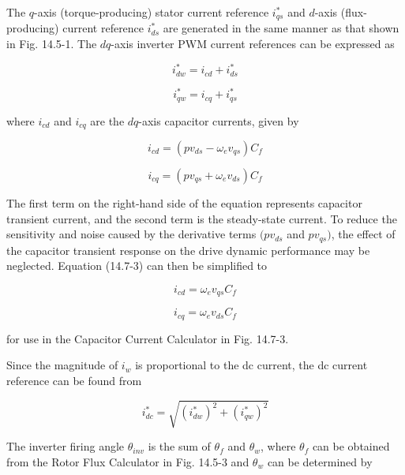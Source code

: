 \documentclass[letterpaper,12pt]{article}
\begin{document}
The $q$-axis (torque-producing) stator current reference $i_{qs}^*$ and $d$-axis (flux-producing) current reference $i_{ds}^*$ are generated in the same manner as that shown in Fig. 14.5-1. The $dq$-axis inverter PWM current references can be expressed as

\begin{equation}
i_{dw}^* = i_{cd} + i_{ds}^* \tag{14.7-2}
\end{equation}

\begin{equation}
i_{qw}^* = i_{cq} + i_{qs}^* \tag{14.7-3}
\end{equation}

where $i_{cd}$ and $i_{cq}$ are the $dq$-axis capacitor currents, given by

\begin{equation}
i_{cd} = (p v_{ds} - \omega_e v_{qs}) C_f \tag{14.7-4}
\end{equation}

\begin{equation}
i_{cq} = (p v_{qs} + \omega_e v_{ds}) C_f \tag{14.7-5}
\end{equation}

The first term on the right-hand side of the equation represents capacitor transient current, and the second term is the steady-state current. To reduce the sensitivity and noise caused by the derivative terms $(p v_{ds}$ and $p v_{qs})$, the effect of the capacitor transient response on the drive dynamic performance may be neglected. Equation (14.7-3) can then be simplified to

\begin{equation}
i_{cd} = \omega_e v_{qs} C_f \tag{14.7-6}
\end{equation}

\begin{equation}
i_{cq} = \omega_e v_{ds} C_f \tag{14.7-7}
\end{equation}

for use in the Capacitor Current Calculator in Fig. 14.7-3.

Since the magnitude of $i_w$ is proportional to the dc current, the dc current reference can be found from

\begin{equation}
i_{dc}^* = \sqrt{(i_{dw}^*)^2 + (i_{qw}^*)^2} \tag{14.7-8}
\end{equation}

The inverter firing angle $\theta_{inv}$ is the sum of $\theta_f$ and $\theta_w$, where $\theta_f$ can be obtained from the Rotor Flux Calculator in Fig. 14.5-3 and $\theta_w$ can be determined by
\end{document}
